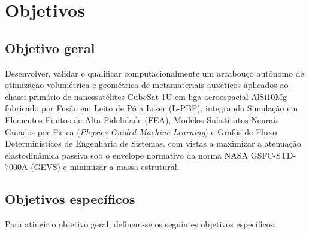 \chapter{Objetivos}
\label{cap:objetivos}

\section{Objetivo geral}
\label{sec:objetivo-geral}

Desenvolver, validar e qualificar computacionalmente um arcabouço autônomo de otimização volumétrica e geométrica de metamateriais auxéticos aplicados ao chassi primário de nanossatélites CubeSat 1U em liga aeroespacial AlSi10Mg fabricado por Fusão em Leito de Pó a Laser (L-PBF), integrando Simulação em Elementos Finitos de Alta Fidelidade (FEA), Modelos Substitutos Neurais Guiados por Física (\textit{Physics-Guided Machine Learning}) e Grafos de Fluxo Determinísticos de Engenharia de Sistemas, com vistas a maximizar a atenuação elastodinâmica passiva sob o envelope normativo da norma NASA GSFC-STD-7000A (GEVS) e minimizar a massa estrutural.

\section{Objetivos específicos}
\label{sec:objetivos-especificos}

Para atingir o objetivo geral, definem-se os seguintes objetivos específicos:

